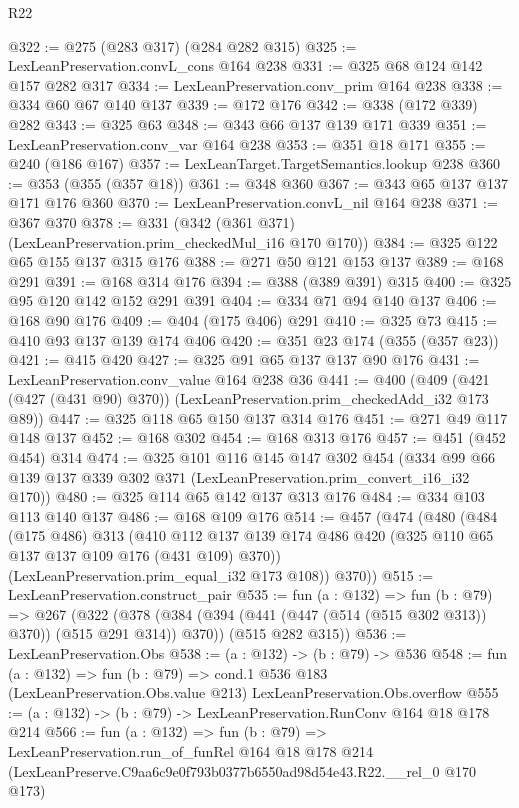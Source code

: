 \begin{lexlean}{R22}
\begin{coremodule}
@322 := @275 (@283 @317) (@284 @282 @315)
@325 := LexLeanPreservation.convL_cons @164 @238
@331 := @325 @68 @124 @142 @157 @282 @317
@334 := LexLeanPreservation.conv_prim @164 @238
@338 := @334 @60 @67 @140 @137
@339 := @172 @176
@342 := @338 (@172 @339) @282
@343 := @325 @63
@348 := @343 @66 @137 @139 @171 @339
@351 := LexLeanPreservation.conv_var @164 @238
@353 := @351 @18 @171
@355 := @240 (@186 @167)
@357 := LexLeanTarget.TargetSemantics.lookup @238
@360 := @353 (@355 (@357 @18))
@361 := @348 @360
@367 := @343 @65 @137 @137 @171 @176 @360
@370 := LexLeanPreservation.convL_nil @164 @238
@371 := @367 @370
@378 := @331 (@342 (@361 @371) (LexLeanPreservation.prim_checkedMul_i16 @170 @170))
@384 := @325 @122 @65 @155 @137 @315 @176
@388 := @271 @50 @121 @153 @137
@389 := @168 @291
@391 := @168 @314 @176
@394 := @388 (@389 @391) @315
@400 := @325 @95 @120 @142 @152 @291 @391
@404 := @334 @71 @94 @140 @137
@406 := @168 @90 @176
@409 := @404 (@175 @406) @291
@410 := @325 @73
@415 := @410 @93 @137 @139 @174 @406
@420 := @351 @23 @174 (@355 (@357 @23))
@421 := @415 @420
@427 := @325 @91 @65 @137 @137 @90 @176
@431 := LexLeanPreservation.conv_value @164 @238 @36
@441 := @400 (@409 (@421 (@427 (@431 @90) @370)) (LexLeanPreservation.prim_checkedAdd_i32 @173 @89))
@447 := @325 @118 @65 @150 @137 @314 @176
@451 := @271 @49 @117 @148 @137
@452 := @168 @302
@454 := @168 @313 @176
@457 := @451 (@452 @454) @314
@474 := @325
    @101
    @116
    @145
    @147
    @302
    @454
    (@334 @99 @66 @139 @137 @339 @302 @371 (LexLeanPreservation.prim_convert_i16_i32 @170))
@480 := @325 @114 @65 @142 @137 @313 @176
@484 := @334 @103 @113 @140 @137
@486 := @168 @109 @176
@514 := @457
    (@474
      (@480
        (@484
          (@175 @486)
          @313
          (@410 @112 @137 @139 @174 @486 @420 (@325 @110 @65 @137 @137 @109 @176 (@431 @109) @370))
          (LexLeanPreservation.prim_equal_i32 @173 @108))
        @370))
@515 := LexLeanPreservation.construct_pair
@535 := fun (a : @132) =>
  fun (b : @79) =>
  @267
    (@322
      (@378 (@384 (@394 (@441 (@447 (@514 (@515 @302 @313)) @370)) (@515 @291 @314)) @370))
      (@515 @282 @315))
@536 := LexLeanPreservation.Obs
@538 := (a : @132) -> (b : @79) -> @536
@548 := fun (a : @132) =>
  fun (b : @79) =>
  cond.{1} @536 @183 (LexLeanPreservation.Obs.value @213) LexLeanPreservation.Obs.overflow
@555 := (a : @132) -> (b : @79) -> LexLeanPreservation.RunConv @164 @18 @178 @214
@566 := fun (a : @132) =>
  fun (b : @79) =>
  LexLeanPreservation.run_of_funRel
    @164
    @18
    @178
    @214
    (LexLeanPreserve.C9aa6c9e0f793b0377b6550ad98d54e43.R22.__rel_0 @170 @173)
\end{coremodule}
\end{lexlean}
